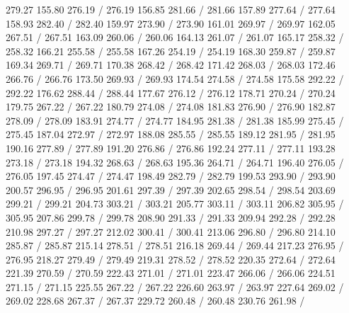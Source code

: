 { 279.27 155.80 276.19 /
 276.19 156.85 281.66 /
 281.66 157.89 277.64 /
 277.64 158.93 282.40 /
 282.40 159.97 273.90 /
 273.90 161.01 269.97 /
 269.97 162.05 267.51 /
 267.51 163.09 260.06 /
 260.06 164.13 261.07 /
 261.07 165.17 258.32 /
 258.32 166.21 255.58 /
 255.58 167.26 254.19 /
 254.19 168.30 259.87 /
 259.87 169.34 269.71 /
 269.71 170.38 268.42 /
 268.42 171.42 268.03 /
 268.03 172.46 266.76 /
 266.76 173.50 269.93 /
 269.93 174.54 274.58 /
 274.58 175.58 292.22 /
 292.22 176.62 288.44 /
 288.44 177.67 276.12 /
 276.12 178.71 270.24 /
 270.24 179.75 267.22 /
 267.22 180.79 274.08 /
 274.08 181.83 276.90 /
 276.90 182.87 278.09 /
 278.09 183.91 274.77 /
 274.77 184.95 281.38 /
 281.38 185.99 275.45 /
 275.45 187.04 272.97 /
 272.97 188.08 285.55 /
 285.55 189.12 281.95 /
 281.95 190.16 277.89 /
 277.89 191.20 276.86 /
 276.86 192.24 277.11 /
 277.11 193.28 273.18 /
 273.18 194.32 268.63 /
 268.63 195.36 264.71 /
 264.71 196.40 276.05 /
 276.05 197.45 274.47 /
 274.47 198.49 282.79 /
 282.79 199.53 293.90 /
 293.90 200.57 296.95 /
 296.95 201.61 297.39 /
 297.39 202.65 298.54 /
 298.54 203.69 299.21 /
 299.21 204.73 303.21 /
 303.21 205.77 303.11 /
 303.11 206.82 305.95 /
 305.95 207.86 299.78 /
 299.78 208.90 291.33 /
 291.33 209.94 292.28 /
 292.28 210.98 297.27 /
 297.27 212.02 300.41 /
 300.41 213.06 296.80 /
 296.80 214.10 285.87 /
 285.87 215.14 278.51 /
 278.51 216.18 269.44 /
 269.44 217.23 276.95 /
 276.95 218.27 279.49 /
 279.49 219.31 278.52 /
 278.52 220.35 272.64 /
 272.64 221.39 270.59 /
 270.59 222.43 271.01 /
 271.01 223.47 266.06 /
 266.06 224.51 271.15 /
 271.15 225.55 267.22 /
 267.22 226.60 263.97 /
 263.97 227.64 269.02 /
 269.02 228.68 267.37 /
 267.37 229.72 260.48 /
 260.48 230.76 261.98 /
}

